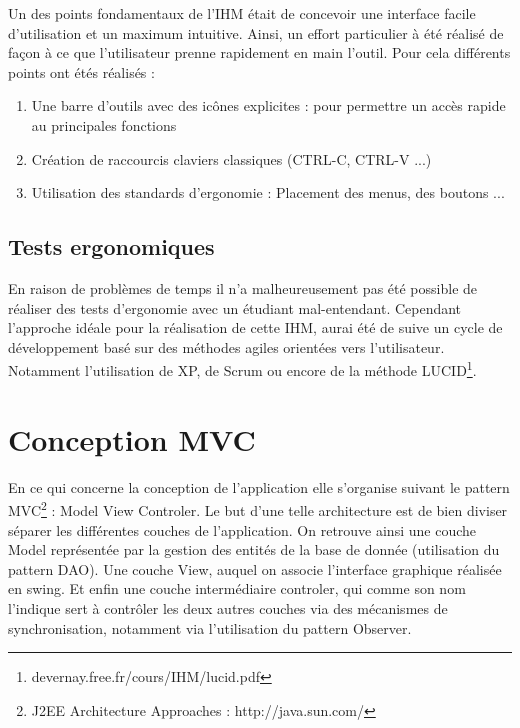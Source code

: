 Un des points fondamentaux de l'IHM était de concevoir une interface facile d'utilisation et un maximum intuitive. Ainsi, un effort particulier à été réalisé de façon à ce que l'utilisateur prenne rapidement en main l'outil. Pour cela différents points ont étés réalisés :

\begin{enumerate}
 \item Une barre d'outils avec des icônes explicites : pour permettre un accès rapide au principales fonctions
 \item Création de raccourcis claviers classiques (CTRL-C, CTRL-V ...)
 \item Utilisation des standards d'ergonomie : Placement des menus, des boutons ...
\end{enumerate}

\subsection{Tests ergonomiques}

En raison de problèmes de temps il n'a malheureusement pas été possible de réaliser des tests d'ergonomie avec un étudiant mal-entendant. Cependant  l'approche idéale pour la réalisation de cette IHM, aurai été de suive un cycle de développement basé sur des méthodes agiles orientées vers l'utilisateur. Notamment l'utilisation de XP, de Scrum ou encore de la méthode LUCID\footnote{devernay.free.fr/cours/IHM/lucid.pdf}.


\section{Conception MVC}

En ce qui concerne la conception de l'application elle s'organise suivant le pattern MVC\footnote{J2EE Architecture Approaches : http://java.sun.com/} : Model View Controler. Le but d'une telle architecture est de bien diviser séparer les différentes couches de l'application. On retrouve ainsi une couche Model représentée par la gestion des entités de la base de donnée (utilisation du pattern DAO). Une couche View, auquel on associe l'interface graphique réalisée en swing. Et enfin une couche intermédiaire controler, qui comme son nom l'indique sert à contrôler les deux autres couches via des mécanismes de synchronisation, notamment via l'utilisation du pattern Observer. 



